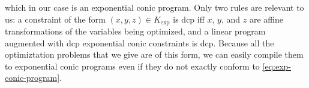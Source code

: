 \documentclass{article}
\begin{document}
which in our case is
 an exponential conic program.
Only two rules are relevant to us: a constraint of the form
$(x,y,z) \in K_{\exp}$ is dcp iff $x$, $y$, and $z$ are affine transformations of the variables being optimized, 
and a linear program
augmented
with dcp exponential conic constraints is dcp.
Because all the optimiztation problems that we give are
of this form,
we can easily compile them
to exponential conic programs even if they do not exactly conform to \eqref{eq:exp-conic-program}.


%


\end{document}
